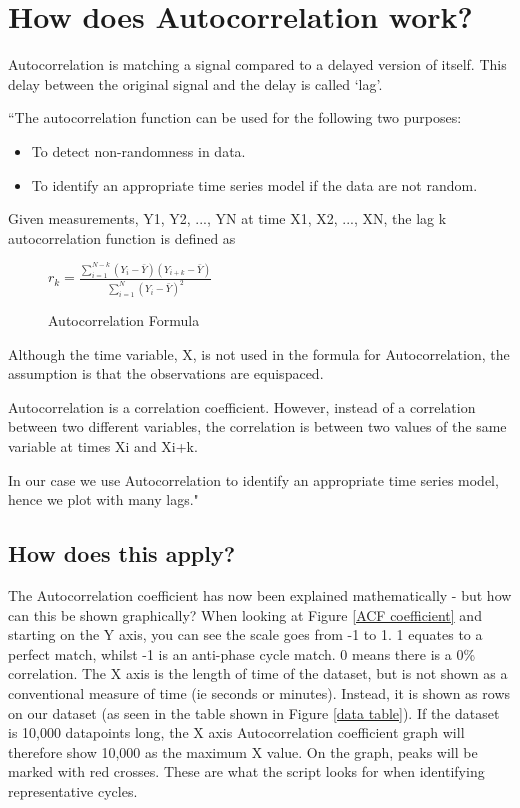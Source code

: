 \section{How does Autocorrelation work?}
Autocorrelation is matching a signal compared to a delayed version of itself. This delay between the original signal and the delay is called ‘lag'. 

``The autocorrelation \cite{Jenkins} function can be used for the following two purposes:

\begin{itemize}

    \item To detect non-randomness in data.
    
    \item To identify an appropriate time series model if the data are not random.
    
\end{itemize}

Given measurements, Y1, Y2, ..., YN at time X1, X2, ..., XN, the lag k autocorrelation function is defined as
\begin{figure}
\centering

\begin{math}
{ {r_{k} = \frac{\sum_{i=1}^{N-k}(Y_{i} - \bar{Y})(Y_{i+k} -  \bar{Y})} {\sum_{i=1}^{N}(Y_{i} - \bar{Y})^{2} }} }
\end{math}

\caption{Autocorrelation Formula}
\label{autocorrolationF}
\end{figure}

Although the time variable, X, is not used in the formula for Autocorrelation, the assumption is that the observations are equispaced.

Autocorrelation is a correlation coefficient. However, instead of a correlation between two different variables, the correlation is between two values of the same variable at times Xi and Xi+k.

In our case we use Autocorrelation to identify an appropriate time series model, hence we plot with many lags." \cite{NIST}

\subsection{How does this apply?}

The Autocorrelation coefficient has now been explained mathematically - but how can this be shown graphically? When looking at Figure \ref{ACF coefficient} and starting on the Y axis, you can see the scale goes from -1 to 1. 1 equates to a perfect match, whilst -1 is an anti-phase cycle match. 0 means there is a 0\% correlation. The X axis is the length of time of the dataset, but is not shown as a conventional measure of time (ie seconds or minutes). Instead, it is shown as rows on our dataset (as seen in the table shown in Figure \ref{data table}). If the dataset is 10,000 datapoints long, the X axis Autocorrelation coefficient graph will therefore show 10,000 as the maximum X value.  On the graph, peaks will be marked with red crosses. These are what the script looks for when identifying representative cycles.

